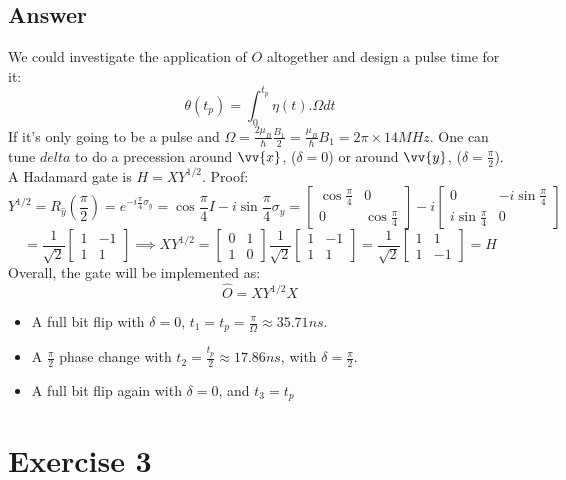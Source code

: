 \documentclass{article}
\begin{document}
\subsection{Answer}
We could investigate the application of $O$ altogether and design a pulse time for it:
$$\theta(t_p) = \int_0^{t_p} \eta(t).\Omega dt$$
If it's only going to be a pulse and $\Omega = \frac{2\mu_B}{\hbar}\frac{B_1}{2} = \frac{\mu_B}{\hbar}B_1 = 2\pi\times 14MHz$.
One can tune $delta$ to do a precession around $\vv{x}$, ($\delta = 0$) or around $\vv{y}$, ($\delta = \frac{\pi}{2}$). A Hadamard gate is $H = XY^{1/2}$. Proof:
$$Y^{1/2} = R_{\hat{y}}(\frac{\pi}{2}) = e^{-i\frac{\pi}{4}\sigma_y} = \cos{\frac{\pi}{4}}I -i\sin{\frac{\pi}{4}}\sigma_y = \begin{bmatrix}
    \cos{\frac{\pi}{4}} & 0\\
    0 & \cos{\frac{\pi}{4}}
\end{bmatrix}-i\begin{bmatrix}
    0 & -i\sin{\frac{\pi}{4}} \\
    i\sin{\frac{\pi}{4}} & 0
\end{bmatrix}$$
$$= \frac{1}{\sqrt{2}}\begin{bmatrix}
    1 & -1 \\
    1 & 1
\end{bmatrix} \implies XY^{1/2} = \begin{bmatrix}
    0 & 1\\
    1 & 0
\end{bmatrix}\frac{1}{\sqrt{2}}\begin{bmatrix}
    1 & -1 \\
    1 & 1
\end{bmatrix} = \frac{1}{\sqrt{2}}\begin{bmatrix}
    1 & 1\\
    1 & -1
\end{bmatrix}=H$$
Overall, the gate will be implemented as:
$$\hat{O} = X Y^{1/2}X$$
\begin{itemize}
    \item A full bit flip with $\delta = 0$, $t_1 = t_p = \frac{\pi}{\Omega} \approx 35.71 ns$.
    \item A $\frac{\pi}{2}$ phase change with $t_2 = \frac{t_p}{2} \approx 17.86ns$, with $\delta = \frac{\pi}{2}$.
    \item A full bit flip again with $\delta = 0$, and $t_3 = t_p$
\end{itemize}
\section{Exercise 3}
\end{document}
